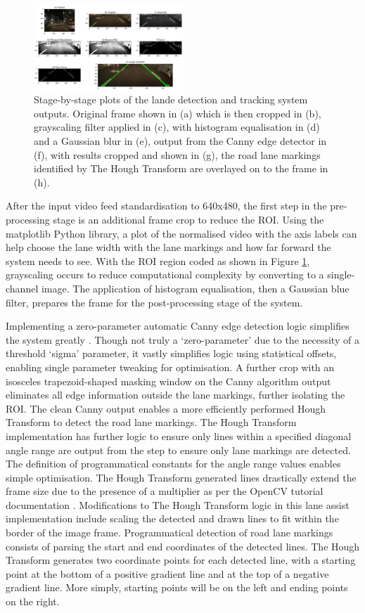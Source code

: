 \documentclass[9pt,conference]{IEEEtran}
\begin{document}
\begin{figure}[htbp]
    \centerline{\includegraphics[width=0.5\textwidth]{assets/LDS_plot.png}}
    \caption{Stage-by-stage plots of the lande detection and tracking system outputs. Original frame shown in (a) which is then cropped in (b), grayscaling filter applied in (c), with histogram equalisation in (d) and a Gaussian blur in (e), output from the Canny edge detector in (f), with results cropped and shown in (g), the road lane markings identified by The Hough Transform are overlayed on to the frame in (h).}
    \label{f2}
\end{figure}

After the input video feed standardisation to 640x480, the first step in the pre-processing stage is an additional frame crop to reduce the ROI. Using the matplotlib Python library, a plot of the normalised video with the axis labels can help choose the lane width with the lane markings and how far forward the system needs to see. With the ROI region coded as shown in Figure \ref{f2}, grayscaling occurs to reduce computational complexity by converting to a single-channel image. The application of histogram equalisation, then a Gaussian blue filter, prepares the frame for the post-processing stage of the system.

Implementing a zero-parameter automatic Canny edge detection logic simplifies the system greatly \cite{b9}. Though not truly a `zero-parameter' due to the necessity of a threshold `sigma' parameter, it vastly simplifies logic using statistical offsets, enabling single parameter tweaking for optimisation. A further crop with an isosceles trapezoid-shaped masking window on the Canny algorithm output eliminates all edge information outside the lane markings, further isolating the ROI. The clean Canny output enables a more efficiently performed Hough Transform to detect the road lane markings. The Hough Transform implementation has further logic to ensure only lines within a specified diagonal angle range are output from the step to ensure only lane markings are detected. The definition of programmatical constants for the angle range values enables simple optimisation. The Hough Transform generated lines drastically extend the frame size due to the presence of a multiplier as per the OpenCV tutorial documentation \cite{b10}. Modifications to The Hough Transform logic in this lane assist implementation include scaling the detected and drawn lines to fit within the border of the image frame. Programmatical detection of road lane markings consists of parsing the start and end coordinates of the detected lines. The Hough Transform generates two coordinate points for each detected line, with a starting point at the bottom of a positive gradient line and at the top of a negative gradient line. More simply, starting points will be on the left and ending points on the right.
\end{document}
